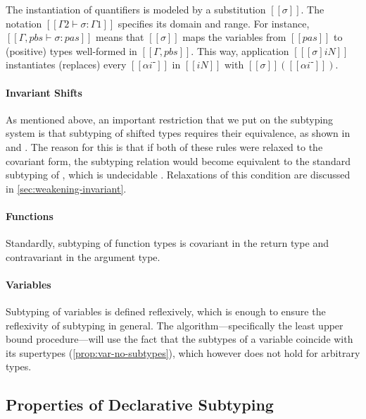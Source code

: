 The instantiation of quantifiers is modeled by a substitution $[[σ]]$.
The notation $[[Γ2 ⊢ σ : Γ1]]$ specifies its domain and range.
For instance, $[[Γ, pbs ⊢ σ : {pas}]]$ means that 
$[[σ]]$ maps the variables from $[[pas]]$ to (positive) types
well-formed in $[[Γ, pbs]]$.
This way, application $[[ [σ]iN ]]$ instantiates (replaces) every
$[[αi⁻]]$ in $[[iN]]$ with $[[σ]]([[αi⁻]])$.

\paragraph*{Invariant Shifts}
As mentioned above, an important restriction that we put on the subtyping system
is that subtyping of shifted types requires their equivalence, as shown in
 and . The
reason for this is that if both of these rules were relaxed to the covariant
form, the subtyping relation would become equivalent to the standard subtyping
of \systemf, which is undecidable \cite{tiuryn-urzczyn-96}. 
Relaxations of this condition are discussed in \cref{sec:weakening-invariant}.


\paragraph*{Functions}
Standardly, subtyping of function types is covariant in the return type
and contravariant in the argument type.

\paragraph*{Variables}
Subtyping of variables is defined reflexively, which is enough to ensure the
reflexivity of subtyping in general. The algorithm---specifically the least
upper bound procedure---will use the fact that the subtypes of a variable
coincide with its supertypes (\cref{prop:var-no-subtypes}),
which however does not hold for arbitrary types.

\subsection{Properties of Declarative Subtyping}
\label{sec:decl-subtyping-properties}

